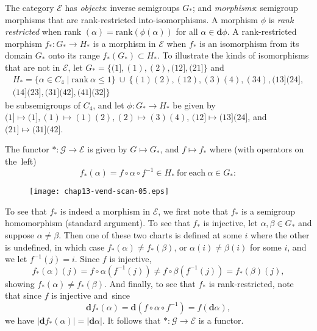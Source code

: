 \documentclass{surv-l}
\numberwithin{equation}{section}
\numberwithin{table}{section}
\numberwithin{figure}{section}
\theoremstyle{plain}
\theoremstyle{definition}
\begin{document}
The category $\mathcal{E}$ has \emph{objects}: inverse semigroups
$G_{\ast}$; and \emph{morphisms}: semigroup morphisms that are
rank-restricted into-isomorphisms. A morphism $\phi$ is \emph{rank
restricted} when rank $(\alpha)=
\mathrm{rank }(\phi(\alpha))$ for all $\alpha\in \mathbf{d}\phi$.
A rank-restricted morphism $f_{\ast}:G_{\ast}\rightarrow H_{\ast}$
is a morphism in $\mathcal{E}$ when $f_{\ast}$ is an isomorphism
from its domain $G_{\ast}$ onto its range
$f_{\ast}(G_{\ast})\subset H_{\ast}$. To illustrate the kinds of
isomorphisms that are not in $\mathcal{E}$, let
$G_{\ast}=\{(1],(1),(2),(12],(21]\}$ and
\begin{align*}
H_{\ast}=\{\alpha\in C_{4}\mid \mathrm{rank}\ \alpha\leq 1\}\ \cup\ \{(1)(2),(12),(3)(4),(34),(13](24], \\
(14](23],(31](42],(41](32]\}
\end{align*}
be subsemigroups of $C_{4}$, and let $\phi :
G_{\ast}\rightarrow H_{\ast}$ be given by $(1]\mapsto(1],(1)
\mapsto (1)(2),(2)\mapsto (3)(4)$, $(12]\mapsto (13](24]$, and
$(21]\mapsto (31](42]$.

The functor $*:\mathcal{G}\rightarrow \mathcal{E}$ is given by
$G\mapsto G_{\ast}$, and $f\mapsto f_{\ast}$ where (with
operators on the~left)
\begin{equation*}
f_{\ast}(\alpha)=f\circ \alpha \circ f^{-1}\in H_{\ast}\ \mathrm{for\ each}\ \alpha\in G_{\ast}:
\end{equation*}
\begin{figure}[!h]
\texttt{[image: chap13-vend-scan-05.eps]}
\end{figure}

\noindent To see that $f_{\ast}$ is indeed a morphism in $\mathcal{E}$,
we first note that $f_{\ast}$ is a semigroup homomorphism
(standard argument). To see that $f_{\ast}$ is injective, let
$\alpha,\beta\in G_{\ast}$ and suppose $\alpha\neq\beta$. Then
one of these two charts is defined at some $i$ where the other
is undefined, in which case $f_{\ast}(\alpha)\neq
f_{\ast}(\beta)$, or $\alpha(i)\neq\beta(i)$ for some $i$, and
we let $f^{-1}(j)=i$. Since $f$ is injective,
\[
f_{\ast}(\alpha)(j)=f\circ \alpha(f^{-1}(j))\neq f\circ \beta(f^{-1}(j))=f_{\ast}(\beta)(j),
\]
showing $f_{\ast}(\alpha)\neq f_{\ast}(\beta)$. And finally,
to see that $f_{\ast}$ is rank-restricted, note that since $f$
is injective and~since
\[
\mathbf{d}f_{\ast}(\alpha)=\mathbf{d}(f\circ \alpha \circ f^{-1})=f(\mathbf{d}\alpha),
\]
we have $|\mathbf{d}f_{\ast}(\alpha)|=|\mathbf{d}\alpha|$. It
follows that $*:\mathcal{G}\rightarrow \mathcal{E}$ is a
functor.
\end{document}
